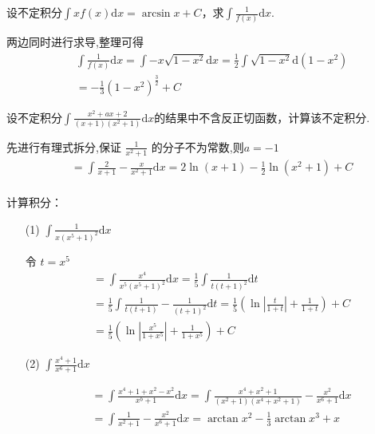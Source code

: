 \begin{xiti}
\begin{solution}
		\end{solution}
	\item 设不定积分$\int x f ( x ) \mathrm { d } x = \arcsin x + C$，求$\int \frac { 1 } { f ( x ) } \mathrm { d } x$.
	\begin{solution}
		两边同时进行求导,整理可得\\
		\begin{align*}
			& \int \frac{1}{f(x)} \mathrm{d} x =\int -x\sqrt{1-x^2} \mathrm{d}x =\frac{1}{2} \int \sqrt{1-x^2} \mathrm{d} (1-x^2) \\
			&=- \frac{1}{3} (1-x^2)^{\frac{3}{2}} + C
		\end{align*}
	\end{solution}
	\item 设不定积分$\int \frac { x ^ { 2 } + a x + 2 } { ( x + 1 ) \left( x ^ { 2 } + 1 \right) }\mathrm{d}x$的结果中不含反正切函数，计算该不定积分.
	\begin{solution}
		先进行有理式拆分,保证 $\frac{1}{x^2+1}$ 的分子不为常数,则$a=-1$
		\begin{align*}
			&= \int \frac{2}{x+1} -\frac{x}{x^2+1} \mathrm{d}x= 2 \ln (x+1)-\frac{1}{2} \ln \left(x^{2}+1\right)+C \\
		\end{align*}
	\end{solution}	
	\item 计算积分：
	\begin{enumerate}
		\item[(1)] $\int \frac { 1 } { x \left( x ^ { 5 } + 1 \right) ^ { 2 } }\mathrm{d}x$
		\begin{solution}
			令 $t=x^5$
		\begin{align*}
			&=\int \frac{x^4}{x^5(x^5+1)^2} \mathrm{d}x =  \frac{1}{5} \int \frac{1}{t(t+1)^2} \mathrm{ d}t\\
			&=\frac{1}{5} \int \frac{1}{t(t+1)}-\frac{1}{(t+1)^2} \mathrm{d}t = \frac{1}{5} ( \ln |\frac{t}{1+t}| +\frac{1}{1+t}) + C  \\
			&=\frac{1}{5} ( \ln |\frac{x^5}{1+x^5}| +\frac{1}{1+x^5}) + C
		\end{align*}
		\end{solution}

		\item[(2)]  $\int \frac { x ^ { 4 } + 1 } { x ^ { 6 } + 1 }\mathrm{d}x$
		\begin{solution}
		\begin{align*}
		&=\int \frac{x^{4}+1+x^{2}-x^{2}}{x^{b}+1} \mathrm{ d}x= \int \frac{x^4+x^2+1}{(x^2+1)(x^4+x^2+1)}-\frac{x^2}{x^6+1} \mathrm{ d}x \\
		&=\int \frac{1}{x^{2}+1}-\frac{x^{2}}{x^{6}+1} \mathrm{d} x =\arctan x^{2}-\frac{1}{3} \arctan x^{3}+x	
		\end{align*}
		\end{solution}	
		

\end{enumerate}
\end{xiti}
